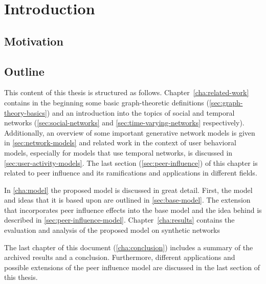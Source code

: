\chapter{Introduction}
\label{cha:introduction}


\section{Motivation}
\label{sec:motivation}






\section{Outline}
\label{sec:outline}

This content of this thesis is structured as follows.
Chapter~\ref{cha:related-work} contains in the beginning some basic graph-theoretic definitions (\autoref{sec:graph-theory-basics}) and an introduction into the topics of social and temporal networks (\autoref{sec:social-networks} and \autoref{sec:time-varying-networks} respectively).
Additionally, an overview of some important generative network models is given in \autoref{sec:network-models} and related work in the context of user behavioral models, especially for models that use temporal networks, is discussed in \autoref{sec:user-activity-models}.
The last section (\autoref{sec:peer-influence}) of this chapter is related to peer influence and its ramifications and applications in different fields.

In \autoref{cha:model} the proposed model is discussed in great detail.
First, the model and ideas that it is based upon are outlined in \autoref{sec:base-model}.
The extension that incorporates peer influence effects into the base model and the idea behind is described in \autoref{sec:peer-influence-model}.
Chapter~\ref{cha:results} contains the evaluation and analysis of the proposed model on synthetic networks

The last chapter of this document (\autoref{cha:conclusion}) includes a summary of the archived results and a conclusion.
Furthermore, different applications and possible extensions of the peer influence model are discussed in the last section of this thesis.
